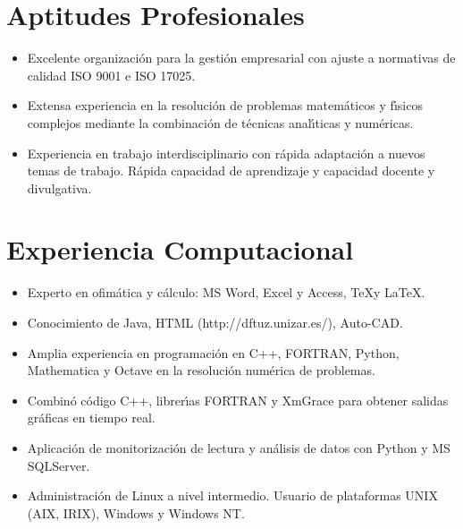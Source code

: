 \documentclass{article}
\begin{document}

\section*{Aptitudes Profesionales}

\begin{itemize}\itemsep 0pt
\item Excelente organizaci\'on para la gesti\'on empresarial con ajuste a normativas de calidad ISO 9001 e ISO 17025.

\item Extensa experiencia en la resoluci\'{o}n de pro\-ble\-mas 
matem\'{a}ticos y f\'{\i}sicos complejos mediante la combinaci\'{o}n 
de t\'{e}cnicas anal\'{\i}ticas y num\'{e}ricas.

\item Experiencia en trabajo interdisciplinario con r\'{a}pida 
adaptaci\'{o}n a nuevos temas de trabajo. R\'{a}pida capacidad de aprendizaje y capacidad docente y divulgativa.
\end{itemize}


\section*{Experiencia Computacional}

\begin{itemize}\itemsep 0pt
\item Experto en ofim\'atica y c\'alculo: MS Word, Excel y Access, \TeX y \LaTeX.

\item Conocimiento de Java, HTML (http://dftuz.unizar.es/), Auto-CAD.

\item Amplia experiencia en programaci\'{o}n en C++, FORTRAN, Python, Mathematica y Octave en la resoluci\'{o}n num\'{e}rica de pro\-ble\-mas.

\item Combin\'{o} c\'{o}digo C++, librer\'{\i}as FORTRAN y XmGrace para obtener salidas gr\'{a}ficas en tiempo real.

\item Aplicaci\'on de monitorizaci\'on de lectura y an\'alisis de datos con Python y MS SQLServer.

\item Administraci\'{o}n de Linux a nivel intermedio.  
Usuario de plataformas UNIX (AIX, IRIX), Windows y Windows NT.
\end{itemize}
\end{document}
